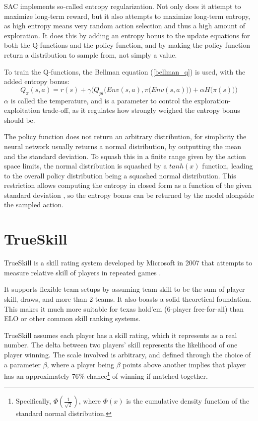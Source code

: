 SAC implements so-called entropy regularization. Not only does it attempt to maximize long-term reward, but it also attempts to maximize long-term entropy, as high entropy means very random action selection and thus a high amount of exploration. It does this by adding an entropy bonus to the update equations for both the Q-functions and the policy function, and by making the policy function return a distribution to sample from, not simply a value.

To train the Q-functions, the Bellman equation (\ref{bellman_q}) is used, with the added entropy bonus:
\begin{equation}
    Q_{\pi}(s, a) = r(s) + \gamma \bigg(Q_{pi}\Big(Env(s, a), \pi\big(Env(s, a)\big)\Big) + \alpha H\big(\pi(s)\big)\bigg)
\end{equation}
$\alpha$ is called the temperature, and is a parameter to control the exploration-exploitation trade-off, as it regulates how strongly weighed the entropy bonus should be.

The policy function does not return an arbitrary distribution, for simplicity the neural network usually returns a normal distribution, by outputting the mean and the standard deviation. To squash this in a finite range given by the action space limits, the normal distribution is squashed by a $tanh(x)$ function, leading to the overall policy distribution being a squashed normal distribution. This restriction allows computing the entropy in closed form as a function of the given standard deviation \cite[explained in detail in the code comments of the SpinningUp SAC implementation]{SpinningUp2018}, so the entropy bonus can be returned by the model alongside the sampled action.

\section{TrueSkill}

TrueSkill is a skill rating system developed by Microsoft in 2007 that attempts to measure relative skill of players in repeated games \cite{TrueSkill_original} \cite{TrueSkill_blog}.

It supports flexible team setups by assuming team skill to be the sum of player skill, draws, and more than 2 teams. It also boasts a solid theoretical foundation. This makes it much more suitable for texas hold'em (6-player free-for-all) than ELO  or other common skill ranking systems.

TrueSkill assumes each player has a skill rating, which it represents as a real number. The delta between two players' skill represents the likelihood of one player winning. The scale involved is arbitrary, and defined through the choice of a parameter $\beta$, where a player being $\beta$ points above another implies that player has an approximately 76\% chance\footnote{Specifically, $\Phi\left(\frac{1}{\sqrt{2}}\right)$, where $\Phi(x)$ is the cumulative density function of the standard normal distribution.} of winning if matched together.

